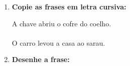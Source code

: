 \begin{exercicio}
\begin{enumerate}
  \item \textbf{Copie as frases em letra cursiva:}
  \begin{center}
  A chave abriu o cofre do coelho.\\
  \underline{\hspace{12cm}}\\
  O carro levou a casa ao sarau.\\
  \underline{\hspace{12cm}}
  \end{center}

  \item \textbf{Desenhe a frase:}
  \begin{center}
  \end{center}

\end{enumerate}

\end{exercicio}

